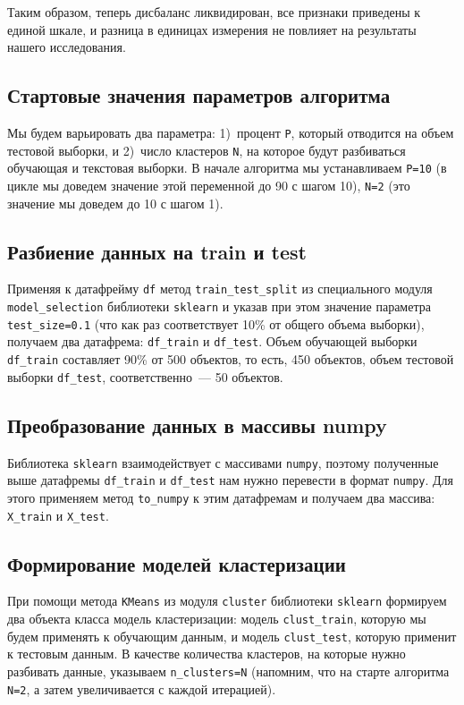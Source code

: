 \documentclass[a4paper,12pt]{article}
\begin{document}
\noindent
Таким образом, теперь дисбаланс ликвидирован, все признаки приведены к единой шкале, и разница в единицах измерения не повлияет на результаты нашего исследования.

\subsection{Стартовые значения параметров алгоритма}

Мы будем варьировать два параметра: 1)~процент \texttt{P}, который отводится на объем тестовой выборки, и 2)~число кластеров \texttt{N}, на которое будут разбиваться обучающая и текстовая выборки. В начале алгоритма мы устанавливаем \texttt{P=10} (в цикле мы доведем значение этой переменной до 90 с шагом 10), \texttt{N=2} (это значение мы доведем до 10 с шагом 1).


\subsection{Разбиение данных на train и test}

Применяя к датафрейму \texttt{df} метод \texttt{train\_test\_split} из специального модуля \texttt{model\_selection} библиотеки \texttt{sklearn} и указав при этом значение параметра \texttt{test\_size=0.1} (что как раз соответствует 10\% от общего объема выборки), получаем два датафрема: \texttt{df\_train} и \texttt{df\_test}. Объем обучающей выборки \texttt{df\_train} составляет 90\% от 500 объектов, то есть, 450 объектов, объем тестовой выборки \texttt{df\_test}, соответственно — 50 объектов.


\subsection{Преобразование данных в массивы numpy}

Библиотека \texttt{sklearn} взаимодействует с массивами \texttt{numpy}, поэтому полученные выше датафремы \texttt{df\_train} и \texttt{df\_test} нам нужно перевести в формат \texttt{numpy}. Для этого применяем метод \texttt{to\_numpy} к этим датафремам и получаем два массива: \texttt{X\_train} и \texttt{X\_test}.

\subsection{Формирование моделей кластеризации}

При помощи метода \texttt{KMeans} из модуля \texttt{cluster} библиотеки \texttt{sklearn} формируем два объекта класса модель кластеризации: модель \texttt{clust\_train}, которую мы будем применять к обучающим данным, и модель \texttt{clust\_test}, которую применит к тестовым данным. В качестве количества кластеров, на которые нужно разбивать данные, указываем \texttt{n\_clusters=N} (напомним, что на старте алгоритма \texttt{N=2}, а затем увеличивается с каждой итерацией).
\end{document}
